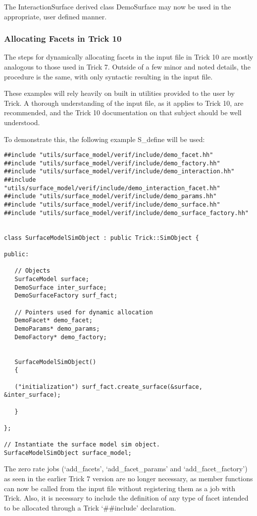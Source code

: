 The InteractionSurface derived class DemoSurface may now be used in
the appropriate, user defined manner.

\subsubsection{Allocating Facets in Trick 10}

The steps for dynamically allocating facets in the input file in Trick 10 are
mostly analogous to those used in Trick 7. Outside of a few minor and noted
details, the procedure is the same, with only syntactic resulting in the input file.

These examples will rely heavily on built in utilities provided to the user by Trick.
A thorough understanding of the input file, as it applies to Trick 10, are
recommended, and the Trick 10 documentation on that subject should be well understood.

To demonstrate this, the following
example S\_define will be used:

\begin{verbatim}
##include "utils/surface_model/verif/include/demo_facet.hh"
##include "utils/surface_model/verif/include/demo_factory.hh"
##include "utils/surface_model/verif/include/demo_interaction.hh"
##include "utils/surface_model/verif/include/demo_interaction_facet.hh"
##include "utils/surface_model/verif/include/demo_params.hh"
##include "utils/surface_model/verif/include/demo_surface.hh"
##include "utils/surface_model/verif/include/demo_surface_factory.hh"


class SurfaceModelSimObject : public Trick::SimObject {

public:

   // Objects
   SurfaceModel surface;
   DemoSurface inter_surface;
   DemoSurfaceFactory surf_fact;

   // Pointers used for dynamic allocation
   DemoFacet* demo_facet;
   DemoParams* demo_params;
   DemoFactory* demo_factory;


   SurfaceModelSimObject()
   {

   ("initialization") surf_fact.create_surface(&surface, &inter_surface);

   }

};

// Instantiate the surface model sim object.
SurfaceModelSimObject surface_model;
\end{verbatim}

The zero rate jobs (`add\_facets', `add\_facet\_params' and `add\_facet\_factory') as seen
in the earlier Trick 7 version are no longer necessary, as member functions can now be called from
the input file without registering them as a job with Trick. Also, it is necessary to include the definition
of any type of facet intended to be allocated through a Trick `\#\#include' declaration.

